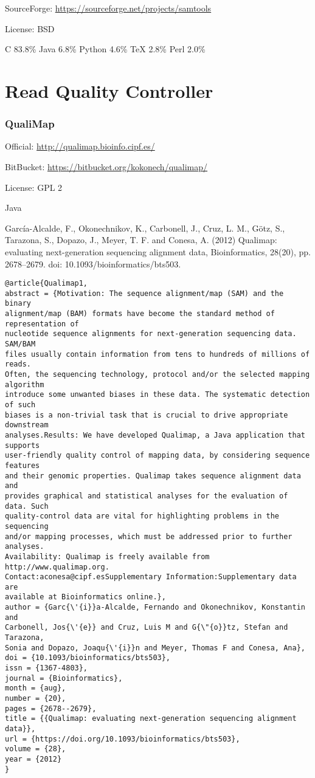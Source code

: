 \documentclass[]{article}
\begin{document}
SourceForge: \url{https://sourceforge.net/projects/samtools}

License: BSD

C 83.8\% Java 6.8\% Python 4.6\% TeX 2.8\% Perl 2.0\%


\part{Read Quality Controller}

\section{QualiMap}

Official: \url{http://qualimap.bioinfo.cipf.es/}

BitBucket: \url{https://bitbucket.org/kokonech/qualimap/}

License: GPL 2

Java

García-Alcalde, F., Okonechnikov, K., Carbonell, J., Cruz, L. M., Götz, S., Tarazona, S., Dopazo, J., Meyer, T. F. and Conesa, A. (2012) Qualimap: evaluating next-generation sequencing alignment data, Bioinformatics, 28(20), pp. 2678–2679. doi: 10.1093/bioinformatics/bts503.

\begin{verbatim}
@article{Qualimap1,
abstract = {Motivation: The sequence alignment/map (SAM) and the binary
alignment/map (BAM) formats have become the standard method of representation of
nucleotide sequence alignments for next-generation sequencing data. SAM/BAM
files usually contain information from tens to hundreds of millions of reads.
Often, the sequencing technology, protocol and/or the selected mapping algorithm
introduce some unwanted biases in these data. The systematic detection of such
biases is a non-trivial task that is crucial to drive appropriate downstream
analyses.Results: We have developed Qualimap, a Java application that supports
user-friendly quality control of mapping data, by considering sequence features
and their genomic properties. Qualimap takes sequence alignment data and
provides graphical and statistical analyses for the evaluation of data. Such
quality-control data are vital for highlighting problems in the sequencing
and/or mapping processes, which must be addressed prior to further analyses.
Availability: Qualimap is freely available from http://www.qualimap.org.
Contact:aconesa@cipf.esSupplementary Information:Supplementary data are
available at Bioinformatics online.},
author = {Garc{\'{i}}a-Alcalde, Fernando and Okonechnikov, Konstantin and
Carbonell, Jos{\'{e}} and Cruz, Luis M and G{\"{o}}tz, Stefan and Tarazona,
Sonia and Dopazo, Joaqu{\'{i}}n and Meyer, Thomas F and Conesa, Ana},
doi = {10.1093/bioinformatics/bts503},
issn = {1367-4803},
journal = {Bioinformatics},
month = {aug},
number = {20},
pages = {2678--2679},
title = {{Qualimap: evaluating next-generation sequencing alignment data}},
url = {https://doi.org/10.1093/bioinformatics/bts503},
volume = {28},
year = {2012}
}
\end{verbatim}
\end{document}
